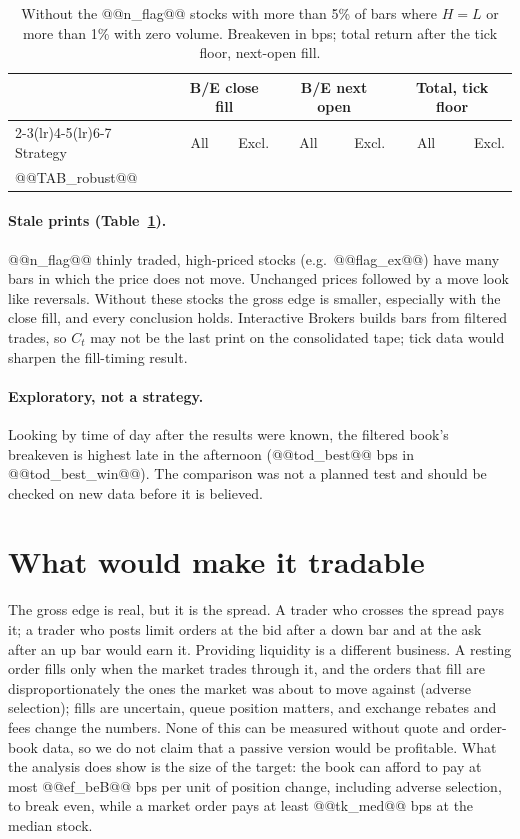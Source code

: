 \documentclass[11pt,a4paper]{article}
\begin{document}
\begin{table}[htbp]
\centering
\caption{Without the @@n_flag@@ stocks with more than 5\% of bars where $H=L$ or more than 1\% with zero volume.
Breakeven in bps; total return after the tick floor, next-open fill.}
\label{tab:robust}
\footnotesize
\setlength{\tabcolsep}{3pt}
\begin{tabular}{@{}lrrrrrr@{}}
\toprule
& \multicolumn{2}{c}{B/E close fill} & \multicolumn{2}{c}{B/E next open} & \multicolumn{2}{c}{Total, tick floor} \\
\cmidrule(lr){2-3}\cmidrule(lr){4-5}\cmidrule(lr){6-7}
Strategy & All & Excl. & All & Excl. & All & Excl. \\
\midrule
@@TAB_robust@@
\bottomrule
\end{tabular}
\end{table}

\paragraph{Stale prints (Table~\ref{tab:robust}).} @@n_flag@@ thinly traded, high-priced stocks (e.g.\
@@flag_ex@@) have many bars in which the price does not move. Unchanged prices followed by a move look
like reversals. Without these stocks the gross edge is smaller, especially with the close fill, and every
conclusion holds. Interactive Brokers builds bars from filtered trades, so $C_t$ may not be the last print
on the consolidated tape; tick data would sharpen the fill-timing result.

\paragraph{Exploratory, not a strategy.} Looking by time of day after the results were known, the filtered
book's breakeven is highest late in the afternoon (@@tod_best@@ bps in @@tod_best_win@@). The comparison was not a planned test and should be checked on new data before it is believed.

\section{What would make it tradable}
\label{sec:tradable}

The gross edge is real, but it is the spread. A trader who crosses the spread pays it; a trader who posts
limit orders at the bid after a down bar and at the ask after an up bar would earn it. Providing liquidity is a different business. A resting order fills only when the market trades through it, and the orders that fill are
disproportionately the ones the market was about to move against (adverse selection); fills are
uncertain, queue position matters, and exchange rebates and fees change the numbers. None of this can be
measured without quote and order-book data, so we do not claim that a passive version would be
profitable. What the analysis does show is the size of the target: the book can afford to pay
at most @@ef_beB@@ bps per unit of position change, including adverse selection, to break even, while a market
order pays at least @@tk_med@@ bps at the median stock.
\end{document}

